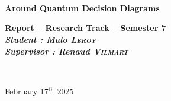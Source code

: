 \begin{center}

~\\[1cm]


\textsc{\Large }\\[0.5cm]

\HRule \\[0.4cm]

{\huge \bfseries Around Quantum Decision Diagrams\\
[0.4cm] }

{\large \bfseries Report -- Research Track -- Semester 7\\[0.4cm] }
{\large \bfseries \textsl{Student : Malo \textsc{Leroy}}\\ }
{\large \bfseries \textsl{Supervisor : Renaud \textsc{Vilmart}}\\[0.4cm] }


\HRule \\[1.5cm]

\begingroup
\let\clearpage\relax
\tableofcontents
\endgroup

\vfill

{\large {February 17${}^\text{th}$ 2025}}

\end{center}